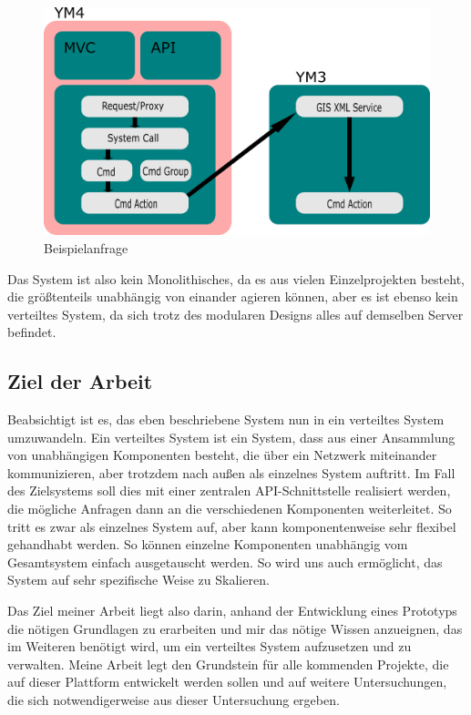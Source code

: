 \documentclass[12pt,a4paper]{scrartcl}
\begin{document}
\begin{figure}[h!]
	\centering
	\includegraphics[scale=2]{YmSysReq.png}
	\caption[Beispielanfrage]{Beispielanfrage}
\end{figure}

Das System ist also kein Monolithisches, da es aus vielen Einzelprojekten besteht, die größtenteils unabhängig von einander agieren können, aber es ist ebenso kein verteiltes System, da sich trotz des modularen Designs alles auf demselben Server befindet.

\subsection{Ziel der Arbeit}
Beabsichtigt ist es, das eben beschriebene System nun in ein verteiltes System umzuwandeln. Ein verteiltes System ist ein System, dass aus einer Ansammlung von unabhängigen Komponenten besteht, die über ein Netzwerk miteinander kommunizieren, aber trotzdem nach außen als einzelnes System auftritt. Im Fall des Zielsystems soll dies mit einer zentralen API-Schnittstelle realisiert werden, die mögliche Anfragen dann an die verschiedenen Komponenten weiterleitet. So tritt es zwar als einzelnes System auf, aber kann komponentenweise sehr flexibel gehandhabt werden. So können einzelne Komponenten unabhängig vom Gesamtsystem einfach ausgetauscht werden. So wird uns auch ermöglicht, das System auf sehr spezifische Weise zu Skalieren.

Das Ziel meiner Arbeit liegt also darin, anhand der Entwicklung eines Prototyps die nötigen Grundlagen zu erarbeiten und mir das nötige Wissen anzueignen, das im Weiteren benötigt wird, um ein verteiltes System aufzusetzen und zu verwalten. Meine Arbeit legt den Grundstein für alle kommenden Projekte, die auf dieser Plattform entwickelt werden sollen und auf weitere Untersuchungen, die sich notwendigerweise aus dieser Untersuchung ergeben.
\end{document}
